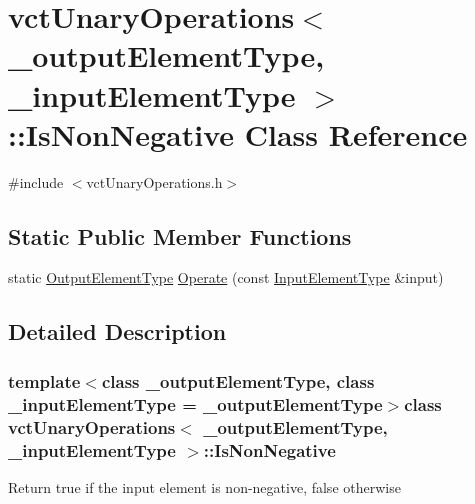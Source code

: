 \hypertarget{classvct_unary_operations_1_1_is_non_negative}{\section{vct\-Unary\-Operations$<$ \-\_\-output\-Element\-Type, \-\_\-input\-Element\-Type $>$\-:\-:Is\-Non\-Negative Class Reference}
\label{classvct_unary_operations_1_1_is_non_negative}
}


{\ttfamily \#include $<$vct\-Unary\-Operations.\-h$>$}

\subsection*{Static Public Member Functions}
\begin{DoxyCompactItemize}
\item 
static \hyperlink{classvct_unary_operations_a42306ac3dd20d32c6d6c66ac3fa2e7b9}{Output\-Element\-Type} \hyperlink{classvct_unary_operations_1_1_is_non_negative_a77cb1743165e934914d288a54cd6b633}{Operate} (const \hyperlink{classvct_unary_operations_abf3b77bb7b8abd7ba72a6a45a65696a7}{Input\-Element\-Type} \&input)
\end{DoxyCompactItemize}


\subsection{Detailed Description}
\subsubsection*{template$<$class \-\_\-output\-Element\-Type, class \-\_\-input\-Element\-Type = \-\_\-output\-Element\-Type$>$class vct\-Unary\-Operations$<$ \-\_\-output\-Element\-Type, \-\_\-input\-Element\-Type $>$\-::\-Is\-Non\-Negative}

Return true if the input element is non-\/negative, false otherwise 

